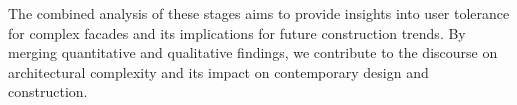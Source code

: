 
The combined analysis of these stages aims to provide insights into user tolerance for complex facades and its implications for future construction trends.
By merging quantitative and qualitative findings, we contribute to the discourse on architectural complexity and its impact on contemporary design and construction.